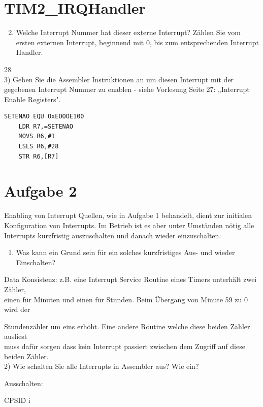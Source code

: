 \documentclass[10pt]{article}
\begin{document}
\section*{TIM2\_IRQHandler}
\begin{enumerate}
  \setcounter{enumi}{1}
  \item Welche Interrupt Nummer hat dieser externe Interrupt? Zählen Sie vom ersten externen Interrupt, beginnend mit 0, bis zum entsprechenden Interrupt Handler.
\end{enumerate}

28\\
3) Geben Sie die Assembler Instruktionen an um diesen Interrupt mit der gegebenen Interrupt Nummer zu enablen - siehe Vorlesung Seite 27: „Interrupt Enable Registers".

\begin{verbatim}
SETENAO EQU OxEOOOE100
    LDR R7,=SETENAO
    MOVS R6,#1
    LSLS R6,#28
    STR R6,[R7]
\end{verbatim}

\section*{Aufgabe 2}
Enabling von Interrupt Quellen, wie in Aufgabe 1 behandelt, dient zur initialen Konfiguration von Interrupts. Im Betrieb ist es aber unter Umständen nötig alle Interrupts kurzfristig auszuschalten und danach wieder einzuschalten.

\begin{enumerate}
  \item Was kann ein Grund sein für ein solches kurzfristiges Aus- und wieder Einschalten?
\end{enumerate}

Data Konsistenz: z.B. eine Interrupt Service Routine eines Timers unterhält zwei Zähler,\\
einen für Minuten und einen für Stunden. Beim Übergang von Minute 59 zu 0 wird der

Stundenzähler um eins erhöht. Eine andere Routine welche diese beiden Zähler ausliest\\
muss dafür sorgen dass kein Interrupt passiert zwischen dem Zugriff auf diese beiden Zähler.\\
2) Wie schalten Sie alle Interrupts in Assembler aus? Wie ein?

Ausschalten:

\begin{displayquote}
CPSID i
\end{displayquote}
\end{document}
